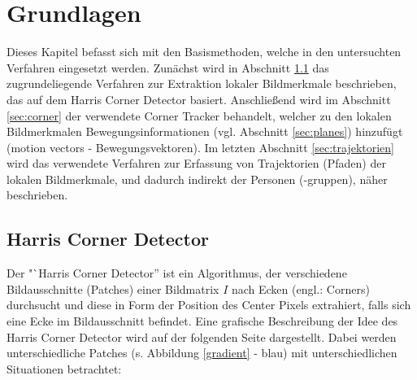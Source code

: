 \chapter{Grundlagen}
\label{chap:grund}

Dieses Kapitel befasst sich mit den Basismethoden, welche in den untersuchten Verfahren eingesetzt werden. Zunächst wird in Abschnitt \ref{sec:harris} das zugrundeliegende Verfahren zur Extraktion lokaler Bildmerkmale beschrieben, das auf dem Harris Corner Detector \cite{collinscourse} basiert. Anschließend wird im Abschnitt \ref{sec:corner} der verwendete Corner Tracker behandelt, welcher zu den lokalen Bildmerkmalen Bewegungsinformationen (vgl. Abschnitt \ref{sec:planes}) hinzufügt (motion vectors - Bewegungsvektoren). Im letzten Abschnitt \ref{sec:trajektorien} wird das verwendete Verfahren zur Erfassung von Trajektorien (Pfaden) der lokalen Bildmerkmale, und dadurch indirekt der Personen (-gruppen), näher beschrieben.

\section{Harris Corner Detector}
\label{sec:harris}
Der "`Harris Corner Detector'' \cite{collinscourse} ist ein Algorithmus, der verschiedene Bildausschnitte (Patches) einer Bildmatrix $I$ nach Ecken (engl.: Corners) durchsucht und diese in Form der Position des Center Pixels extrahiert, falls sich eine Ecke im Bildausschnitt befindet. Eine grafische Beschreibung der Idee des Harris Corner Detector wird auf der folgenden Seite dargestellt. Dabei werden unterschiedliche Patches (s. Abbildung \ref{gradient} - blau) mit unterschiedlichen Situationen betrachtet:

